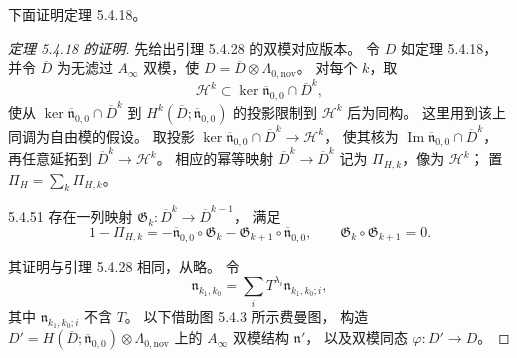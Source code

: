 下面证明定理 5.4.18。
\begin{proof}[定理 5.4.18 的证明]
先给出引理 5.4.28 的双模对应版本。
令 $D$ 如定理 5.4.18，
并令 $\overline D$ 为无滤过
$A_\infty$ 双模，使
$D=\overline D\otimes\Lambda_{0,\mathrm{nov}}$。
对每个 $k$，取
\[
\mathcal H^k\subset
\ker\overline{\mathfrak n}_{0,0}\cap\overline D^k,
\]
使从
$\ker\overline{\mathfrak n}_{0,0}\cap\overline D^k$
到
$H^k(\overline D;\overline{\mathfrak n}_{0,0})$
的投影限制到 $\mathcal H^k$ 后为同构。
这里用到该上同调为自由模的假设。
取投影
$\ker\overline{\mathfrak n}_{0,0}\cap\overline D^k
\to\mathcal H^k$，
使其核为
$\operatorname{Im}\overline{\mathfrak n}_{0,0}
\cap\overline D^k$，
再任意延拓到 $\overline D^k\to\mathcal H^k$。
相应的幂等映射
$\overline D^k\to\overline D^k$
记为 $\Pi_{H,k}$，像为 $\mathcal H^k$；
置 $\Pi_H=\sum_k\Pi_{H,k}$。

\begin{lemma}{5.4.51}\label{lem:5-4-51}
存在一列映射
$\mathfrak G_k\colon
\overline D^k\to\overline D^{k-1}$，
满足
\[
1-\Pi_{H,k}
=-\overline{\mathfrak n}_{0,0}\circ\mathfrak G_k
-\mathfrak G_{k+1}\circ\overline{\mathfrak n}_{0,0},
\qquad
\mathfrak G_k\circ\mathfrak G_{k+1}=0.
\]
\end{lemma}
其证明与引理 5.4.28 相同，从略。
令
\[
\mathfrak n_{k_1,k_0}
=\sum_iT^{\lambda_i}\mathfrak n_{k_1,k_0;i},
\]
其中 $\mathfrak n_{k_1,k_0;i}$ 不含 $T$。
以下借助图 5.4.3 所示费曼图，
构造
$D'=H(\overline D;\overline{\mathfrak n}_{0,0})
\otimes\Lambda_{0,\mathrm{nov}}$
上的 $A_\infty$ 双模结构 $\mathfrak n'$，
以及双模同态 $\varphi\colon D'\to D$。


\end{proof}

